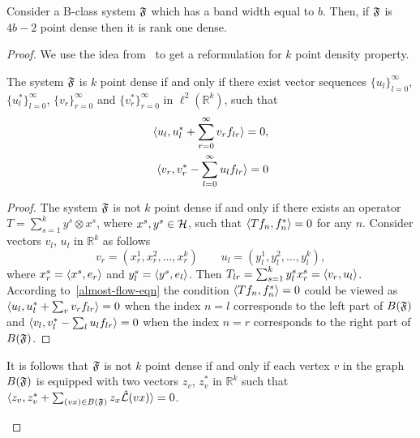 \documentclass[12pt,oneside,a4paper]{amsart}
\begin{document}
      \begin{theorem}
        Consider a B-class system $\fsys$ which has a band width equal to $b$.
        Then, if $\fsys$ is $4b - 2$ point dense then it is rank one dense.
      \end{theorem}
      \begin{proof}
        We use the idea from~\cite{me} to get a reformulation for $k$ point density property.
        \begin{prop}
          The system $\fsys$ is $k$ point dense if and only if there exist vector sequences $\{u_l\}_{l=0}^\infty$, $\{u^*_l\}_{l=0}^\infty$,
            $\{v_r\}_{r=0}^\infty$ and $\{v^*_r\}_{r=0}^\infty$ in $\ell^2 (\mathbb{R}^k)$, such that 
          \begin{align*}
            \label{prop-vec-eqn}
            \inner{u_l}{u^*_l + \sum_{r=0}^\infty v_r f_{lr}} = 0, \\
            \inner{v_r}{v^*_r - \sum_{l=0}^\infty u_l f_{lr}} = 0
          \end{align*}
        \end{prop}
        \begin{proof}
          The system $\fsys$ is not $k$ point dense if and only if there exists an operator $T = \sum_{s=1}^k y^s \otimes x^s$, where
            $x^s, y^s \in \cal{H}$, such that $\inner{Tf_n}{f_n^*} = 0$ for any $n$.
          Consider vectors $v_l$, $u_l$ in $\mathbb{R}^k$ as follows
          \begin{equation*}
            v_r = (x^1_r, x^2_r, \dots, x^k_r)\qquad
            u_l = (y^1_l, y^2_l, \dots, y^k_l),
          \end{equation*}
            where $x^s_r = \inner{x^s}{e_r}$ and $y^s_l = \inner{y^s}{e_l}$.
          Then $T_{lr} = \sum_{s=1}^k y^s_l x^s_r = \inner{v_r}{u_l}$.
          According to~\eqref{almost-flow-eqn} the condition $\inner{Tf_n}{f^*_n} = 0$ could be viewed as
            $\inner{u_l}{u^*_l + \sum_r v_r f_{lr}} = 0$
          when the index $n=l$ corresponds to the left part of $B(\fsys)$ and
            $\inner{v_l}{v^*_l - \sum_l u_l f_{lr}} = 0$
          when the index $n=r$ corresponds to the right part of $B(\fsys)$.
        \end{proof}
        \begin{remark}
          It is follows that $\fsys$ is not $k$ point dense if and only if each vertex $v$ in the graph $B(\fsys)$ is equipped with two vectors $z_v$, $z_v^*$ in $\mathbb{R}^k$
            such that $\inner{z_v}{z_v^* + \sum_{(vx) \in B(\fsys)} z_x \wt(vx)} = 0$.
        \end{remark}


\end{proof}
\end{document}
